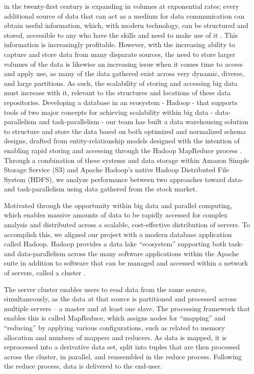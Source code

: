 \documentclass[journal]{IEEEtran}
\begin{document}
	 in the twenty-first century is expanding in volumes
	at exponential rates; every additional source of data that can act as a
	medium for data communication can obtain useful information, which,
	with modern technology, can be structured and stored, accessible to any
	who have the skills and need to make use of it \cite{BigDataComputing}. 
	This information is increasingly profitable. 
	However, with the increasing ability to capture and store data from many
	disparate sources, the need to store larger volumes of the data is
	likewise an increasing issue when it comes time to access and apply use,
	as many of the data gathered exist across very dynamic, diverse, and
	large partitions. 
	As such, the scalability of storing and accessing big data must increase
	with it, relevant to the structures and locations of these data repositories. 
	Developing a database in an ecosystem - Hadoop - that supports tools of
	two major concepts for achieving scalability within big data -
	data-parallelism and task-parallelism - our team has built a data
	warehousing solution to structure and store the data based on both
	optimized and normalized schema designs, drafted from entity-relationship
	models designed with the intention of enabling rapid storing and accessing
	through the Hadoop MapReduce process \cite{BigDataComputing}. 
	Through a combination of these systems and data storage within
	Amazon Simple Storage Service (S3) and Apache Hadoop's native Hadoop
	Distributed File System (HDFS), we analyze performance between two
	approaches toward data- and task-parallelism using data gathered from
	the stock market.
	
	Motivated through the opportunity within big data and parallel computing,
	which enables massive amounts of data to be rapidly accessed for complex
	analysis and distributed across a scalable, cost-effective distribution of
	servers. To accomplish this, we aligned our project with a modern database
	application called Hadoop. Hadoop provides a data lake ``ecosystem'' 
	supporting both task- and data-parallelism across the many software
	applications within the Apache suite in addition to software that can 
	be managed and accessed within a network of servers, called a cluster \cite{Intel, BigDataComputing}.
	
	The server cluster enables users to read data from the same source,
	simultaneously, as the data at that source is partitioned and
	processed across multiple servers – a master and at least one slave. 
	The processing framework that enables this is called MapReduce, 
	which assigns nodes for ``mapping'' and ``reducing'' by applying 
	various configurations, such as related to memory allocation and numbers
	of mappers and reducers. As data is mapped, it is reprocessed into a derivative 
	data set, split into tuples that are then processed across the cluster, in parallel, and reassembled in the reduce process. Following the reduce process, data is delivered to 
	the end-user.
	
\end{document}
